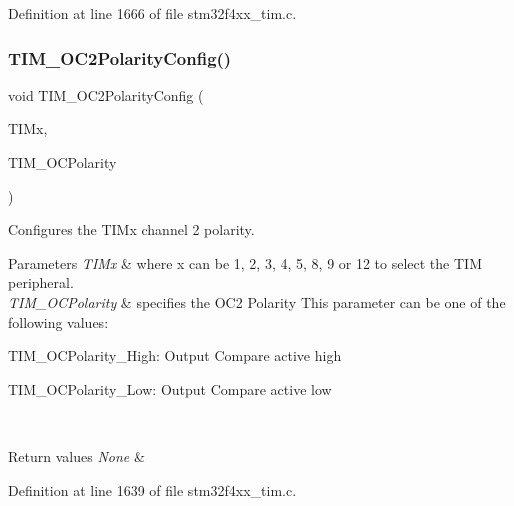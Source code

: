 Definition at line 1666 of file stm32f4xx\+\_\+tim.\+c.

\mbox{\label{group___t_i_m___group2_ga6831cacaac1ef50291af94db94450797}} 
\subsubsection{\texorpdfstring{T\+I\+M\+\_\+\+O\+C2\+Polarity\+Config()}{TIM\_OC2PolarityConfig()}}
{\footnotesize\ttfamily void T\+I\+M\+\_\+\+O\+C2\+Polarity\+Config (\begin{DoxyParamCaption}\item[{\hyperlink{struct_t_i_m___type_def}{T\+I\+M\+\_\+\+Type\+Def} $\ast$}]{T\+I\+Mx,  }\item[{uint16\+\_\+t}]{T\+I\+M\+\_\+\+O\+C\+Polarity }\end{DoxyParamCaption})}



Configures the T\+I\+Mx channel 2 polarity. 


\begin{DoxyParams}{Parameters}
{\em T\+I\+Mx} & where x can be 1, 2, 3, 4, 5, 8, 9 or 12 to select the T\+IM peripheral. \\
\hline
{\em T\+I\+M\+\_\+\+O\+C\+Polarity} & specifies the O\+C2 Polarity This parameter can be one of the following values\+: \begin{DoxyItemize}
\item T\+I\+M\+\_\+\+O\+C\+Polarity\+\_\+\+High\+: Output Compare active high \item T\+I\+M\+\_\+\+O\+C\+Polarity\+\_\+\+Low\+: Output Compare active low \end{DoxyItemize}
\\
\hline
\end{DoxyParams}

\begin{DoxyRetVals}{Return values}
{\em None} & \\
\hline
\end{DoxyRetVals}


Definition at line 1639 of file stm32f4xx\+\_\+tim.\+c.

\mbox{\label{group___t_i_m___group2_ga75b4614c6dd2cd52f2c5becdb6590c10}} 
